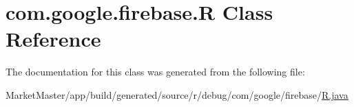 \hypertarget{classcom_1_1google_1_1firebase_1_1R}{}\section{com.\+google.\+firebase.\+R Class Reference}
\label{classcom_1_1google_1_1firebase_1_1R}


The documentation for this class was generated from the following file\+:\begin{DoxyCompactItemize}
\item 
Market\+Master/app/build/generated/source/r/debug/com/google/firebase/\mbox{\hyperlink{debug_2com_2google_2firebase_2R_8java}{R.\+java}}\end{DoxyCompactItemize}
